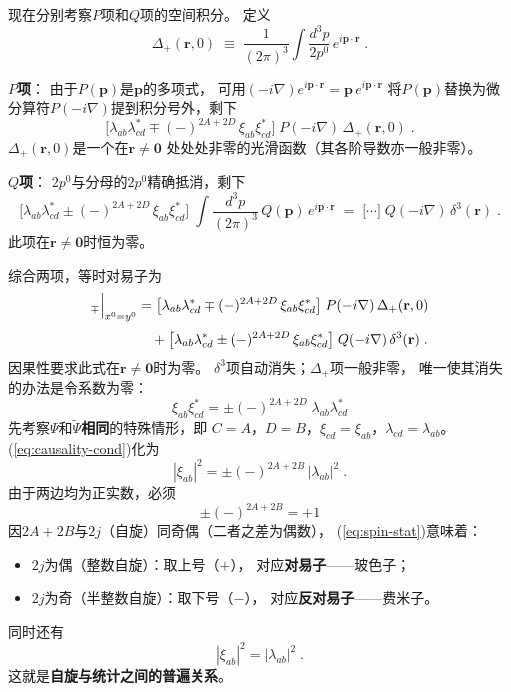 现在分别考察$P$项和$Q$项的空间积分。
定义
\[
  \Delta_{+}(\mathbf{r},0)
  \;\equiv\; \frac{1}{(2\pi)^{3}}\int\frac{d^{3}p}{2p^{0}}\,
    e^{i\boldsymbol{p}\cdot\mathbf{r}}\;.
\]

\noindent\textbf{$P$项}：
由于$P(\boldsymbol{p})$是$\boldsymbol{p}$的多项式，
可用$(-i\nabla)e^{i\boldsymbol{p}\cdot\mathbf{r}}=\boldsymbol{p}\,e^{i\boldsymbol{p}\cdot\mathbf{r}}$
将$P(\boldsymbol{p})$替换为微分算符$P(-i\nabla)$提到积分号外，剩下
\[
  \bigl[\lambda_{ab}\lambda_{cd}^{*}
    \mp (-)^{2A+2D}\,\xi_{ab}\xi_{cd}^{*}\bigr]\;
    P(-i\nabla)\,\Delta_{+}(\mathbf{r},0)\;.
\]
$\Delta_{+}(\mathbf{r},0)$是一个在$\mathbf{r}\neq\mathbf{0}$
处处处非零的光滑函数（其各阶导数亦一般非零）。

\medskip
\noindent\textbf{$Q$项}：
$2p^{0}$与分母的$2p^{0}$精确抵消，剩下
\[
  \bigl[\lambda_{ab}\lambda_{cd}^{*}
    \pm (-)^{2A+2D}\,\xi_{ab}\xi_{cd}^{*}\bigr]\;
  \int\frac{d^{3}p}{(2\pi)^{3}}\,Q(\boldsymbol{p})\,e^{i\boldsymbol{p}\cdot\mathbf{r}}
  \;=\;
  \bigl[\cdots\bigr]\;Q(-i\nabla)\,\delta^{3}(\mathbf{r})\;.
\]
此项在$\mathbf{r}\neq\mathbf{0}$时恒为零。

\vspace{2ex}
\medskip
综合两项，等时对易子为
\begin{align}
  [\Psi_{ab},\widetilde{\Psi}_{cd}^{\dagger}]_{\mp}
  \Big|_{x^{0}=y^{0}}
  &= \bigl[\lambda_{ab}\lambda_{cd}^{*}
     \mp(-)^{2A+2D}\,\xi_{ab}\xi_{cd}^{*}\bigr]\;
     P(-i\nabla)\,\Delta_{+}(\mathbf{r},0)
     \notag\\[3pt]
  &\quad
   + \bigl[\lambda_{ab}\lambda_{cd}^{*}
     \pm(-)^{2A+2D}\,\xi_{ab}\xi_{cd}^{*}\bigr]\;
     Q(-i\nabla)\,\delta^{3}(\mathbf{r})\;.
  \label{eq:equal-time}
\end{align}
因果性要求此式在$\mathbf{r}\neq\mathbf{0}$时为零。
$\delta^{3}$项自动消失；$\Delta_{+}$项一般非零，
唯一使其消失的办法是令系数为零：
\begin{equation}\label{eq:causality-cond}
  \xi_{ab}\xi_{cd}^{*}
  = \pm(-)^{2A+2D}\;\lambda_{ab}\lambda_{cd}^{*}
\end{equation}
先考察$\Psi$和$\widetilde{\Psi}$\textbf{相同}的特殊情形，即
$C=A$，$D=B$，$\xi_{cd}=\xi_{ab}$，$\lambda_{cd}=\lambda_{ab}$。
(\ref{eq:causality-cond})化为
\begin{equation}\label{eq:same-field}
  |\xi_{ab}|^{2} = \pm(-)^{2A+2B}\,|\lambda_{ab}|^{2}\;.
\end{equation}
由于两边均为正实数，必须
\begin{equation}\label{eq:spin-stat}
  \pm(-)^{2A+2B} = +1
\end{equation}
因$2A+2B$与$2j$（自旋）同奇偶（二者之差为偶数），
(\ref{eq:spin-stat})意味着：
\begin{itemize}
  \item $2j$为偶（整数自旋）：取上号（$+$），
        对应\textbf{对易子}——玻色子；
  \item $2j$为奇（半整数自旋）：取下号（$-$），
        对应\textbf{反对易子}——费米子。
\end{itemize}
同时还有
\begin{equation}\label{eq:mod-equal}
  |\xi_{ab}|^{2}=|\lambda_{ab}|^{2}\;.
\end{equation}
这就是\textbf{自旋与统计之间的普遍关系}。


